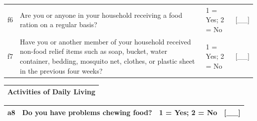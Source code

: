\documentclass[12pt,a4paper]{book}
\theoremstyle{definition}
\theoremstyle{definition}
\theoremstyle{definition}
\theoremstyle{remark}
\begin{document}
\begin{longtable}[]{@{}llll@{}}
\toprule
\begin{minipage}[t]{0.09\columnwidth}\raggedright
f6\strut
\end{minipage} & \begin{minipage}[t]{0.41\columnwidth}\raggedright
Are you or anyone in your household receiving a food ration on a regular
basis?\strut
\end{minipage} & \begin{minipage}[t]{0.25\columnwidth}\raggedright
1 = Yes; 2 = No\strut
\end{minipage} & \begin{minipage}[t]{0.13\columnwidth}\raggedright
{[}\_\_{]}\strut
\end{minipage}\tabularnewline
\begin{minipage}[t]{0.09\columnwidth}\raggedright
f7\strut
\end{minipage} & \begin{minipage}[t]{0.41\columnwidth}\raggedright
Have you or another member of your household received non-food relief
items such as soap, bucket, water container, bedding, mosquito net,
clothes, or plastic sheet in the previous four weeks?\strut
\end{minipage} & \begin{minipage}[t]{0.25\columnwidth}\raggedright
1 = Yes; 2 = No\strut
\end{minipage} & \begin{minipage}[t]{0.13\columnwidth}\raggedright
{[}\_\_{]}\strut
\end{minipage}\tabularnewline
\bottomrule
\end{longtable}

\begin{longtable}[]{@{}c@{}}
\toprule
\begin{minipage}[t]{0.97\columnwidth}\centering
\textbf{Activities of Daily Living}\strut
\end{minipage}\tabularnewline
\bottomrule
\end{longtable}

\begin{longtable}[]{@{}llll@{}}
\toprule
\begin{minipage}[t]{0.09\columnwidth}\raggedright
a8\strut
\end{minipage} & \begin{minipage}[t]{0.41\columnwidth}\raggedright
Do you have problems chewing food?\strut
\end{minipage} & \begin{minipage}[t]{0.25\columnwidth}\raggedright
1 = Yes; 2 = No\strut
\end{minipage} & \begin{minipage}[t]{0.13\columnwidth}\raggedright
{[}\_\_{]}\strut
\end{minipage}\tabularnewline
\bottomrule
\end{longtable}
\end{document}
